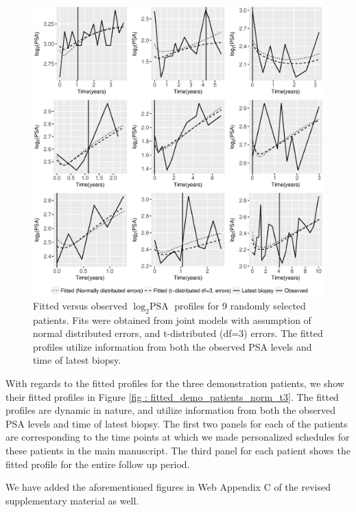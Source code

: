 \begin{enumerate}
    \begin{figure}[!htb]
    \centerline{\includegraphics[width=\columnwidth]{images/model_fit/subject_fittedVsObserved_psa_norm_t3.eps}}
    \caption{Fitted versus observed $\log_2 \mbox{PSA}$ profiles for 9 randomly selected patients. Fits were obtained from joint models with assumption of normal distributed errors, and t-distributed (df=3) errors. The fitted profiles utilize information from both the observed PSA levels and time of latest biopsy.}
    \label{fig : subject_fittedVsObserved_psa_norm_t3_ref2}
    \end{figure}

    With regards to the fitted profiles for the three demonstration patients, we show their fitted profiles in Figure \ref{fig : fitted_demo_patients_norm_t3}. The fitted profiles are dynamic in nature, and utilize information from both the observed PSA levels and time of latest biopsy. The first two panels for each of the patients are corresponding to the time points at which we made personalized schedules for these patients in the main manuscript. The third panel for each patient shows the fitted profile for the entire follow up period.

    We have added the aforementioned figures in Web Appendix C of the revised supplementary material as well.
    

\end{enumerate}
